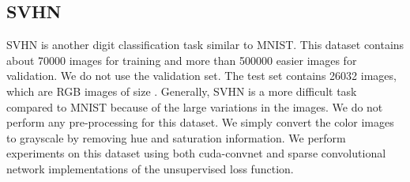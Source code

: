 \documentclass{article}
\begin{document}
\subsection{SVHN}
\vspace{-0.1cm}
SVHN is another digit classification task similar to MNIST. This dataset contains about 70000 images for training and more than 500000 easier images \cite{netzer2011reading} for validation. We do not use the validation set. The test set contains 26032 images, which are RGB images of size . Generally, SVHN is a more difficult task compared to MNIST because of the large variations in the images. We do not perform any pre-processing for this dataset. We simply convert the color images to grayscale by removing hue and saturation information. We perform experiments on this dataset using both cuda-convnet and sparse convolutional network implementations of the unsupervised loss function. 
\end{document}
